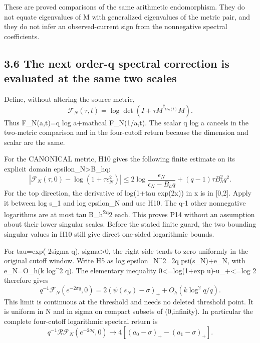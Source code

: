 These are proved comparisons of the same arithmetic endomorphism. They do not equate eigenvalues of M with generalized eigenvalues of the metric pair, and they do not infer an observed-current sign from the nonnegative spectral coefficients.

\subsection{3.6 The next order-q spectral correction is evaluated at the same two scales}\label{the-next-order-q-spectral-correction-is-evaluated-at-the-same-two-scales}

Define, without altering the source metric, \[
 \mathcal F_N(\tau,t)=\log\det(I+\tau M^{\dagger_{G_N(t)}}M).
\] Thus F\_N(a,t)=q log a+mathcal F\_N(1/a,t). The scalar q log a cancels in the two-metric comparison and in the four-cutoff return because the dimension and scalar are the same.

For the CANONICAL metric, H10 gives the following finite estimate on its explicit domain epsilon\_N\textgreater B\_hq: \[
 \boxed{\left|\mathcal F_N(\tau,0)
 -\log(1+\tau\epsilon_N^2)\right|
 \le2\log\frac{\epsilon_N}{\epsilon_N-B_hq}
 +(q-1)\tau B_h^2q^2.}\tag{P14}
\] For the top direction, the derivative of log(1+tau exp(2x)) in x is in {[}0,2{]}. Apply it between log s\_1 and log epsilon\_N and use H10. The q-1 other nonnegative logarithms are at most tau B\_h\textsuperscript{2q}2 each. This proves P14 without an assumption about their lower singular scales. Before the stated finite guard, the two bounding singular values in H10 still give direct one-sided logarithmic bounds.

For tau=exp(-2sigma q), sigma\textgreater0, the right side tends to zero uniformly in the original cutoff window. Write H5 as log epsilon\_N\^{}2=2q psi(s\_N)+e\_N, with \textbar e\_N\textbar=O\_h(k log\^{}2 q). The elementary inequality 0\textless=log(1+exp u)-u\_+\textless=log 2 therefore gives \[
 \boxed{q^{-1}\mathcal F_N(e^{-2\sigma q},0)
 =2(\psi(s_N)-\sigma)_++O_h(k\log^2q/q).}\tag{P15}
\] This limit is continuous at the threshold and needs no deleted threshold point. It is uniform in N and in sigma on compact subsets of (0,infinity). In particular the complete four-cutoff logarithmic spectral return is \[
 \boxed{q^{-1}\mathcal R\mathcal F_N(e^{-2\sigma q},0)
 \longrightarrow4[(a_0-\sigma)_+-(a_1-\sigma)_+].}\tag{P16}
\]


